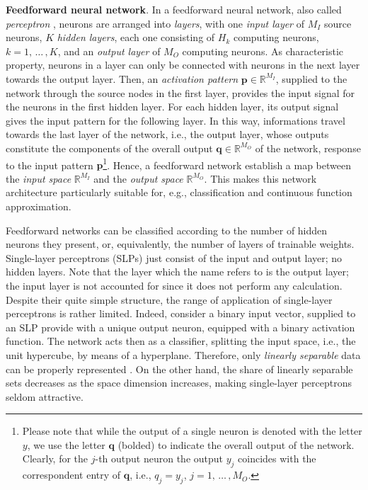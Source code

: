 \documentclass[12pt, a4paper, twoside, openright]{report}
\numberwithin{equation}{chapter}
\theoremstyle{theorem}
\theoremstyle{definition}
\theoremstyle{remark}
\theoremstyle{proposition}
\numberwithin{figure}{chapter}
\begin{document}
		\noindent \textbf{Feedforward neural network}. In a feedforward neural network, also called \emph{perceptron} \cite{Ros58}, neurons are arranged into \emph{layers}, with one \emph{input layer} of $M_I$ source neurons, $K$ \emph{hidden layers}, each one consisting of $H_k$ computing neurons, $k = 1, \, \ldots \, , K$, and an \emph{output layer} of $M_O$ computing neurons. As characteristic property, neurons in a layer can only be connected with neurons in the next layer towards the output layer. Then, an \emph{activation pattern} $\mathbf{p} \in \mathbb{R}^{M_I}$, supplied to the network through the source nodes in the first layer, provides the input signal for the neurons in the first hidden layer. For each hidden layer, its output signal gives the input pattern for the following layer. In this way, informations travel towards the last layer of the network, i.e., the output layer, whose outputs constitute the components of the overall output $\mathbf{q} \in \mathbb{R}^{M_O}$ of the network, response to the input pattern $\mathbf{p}$\footnote{Please note that while the output of a single neuron is denoted with the letter $y$, we use the letter $\mathbf{q}$ (bolded) to indicate the overall output of the network. Clearly, for the $j$-th output neuron the output $y_j$ coincides with the correspondent entry of $\mathbf{q}$, i.e., $q_j = y_j$, $j = 1, \, \ldots \, , M_O$.}. Hence, a feedforward network establish a map between the \emph{input space} $\mathbb{R}^{M_I}$ and the \emph{output space} $\mathbb{R}^{M_O}$. This makes this network architecture particularly suitable for, e.g., classification and continuous function approximation.
		
		Feedforward networks can be classified according to the number of hidden neurons they present, or, equivalently, the number of layers of trainable weights. Single-layer perceptrons (SLPs) just consist of the input and output layer; no hidden layers. Note that the layer which the name refers to is the output layer; the input layer is not accounted for since it does not perform any calculation. Despite their quite simple structure, the range of application of single-layer perceptrons is rather limited. Indeed, consider a binary input vector, supplied to an SLP provide with a unique output neuron, equipped with a binary activation function. The network acts then as a classifier, splitting the input space, i.e., the unit hypercube, by means of a hyperplane. Therefore, only \emph{linearly separable} data can be properly represented \cite{Kri}. On the other hand, the share of linearly separable sets decreases as the space dimension increases, making single-layer perceptrons seldom attractive.
		
\end{document}
